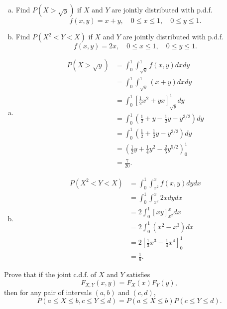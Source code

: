 \documentclass[14pt]{elegantbook}
\begin{document}
    \begin{exercise}
        \begin{enumerate}[(a)]
            \item Find $P(X>\sqrt{y})$ if $X$ and $Y$ are jointly distributed with p.d.f. 
            \[f(x,y)=x+y, \quad 0\leq x\leq 1, \quad 0\leq y\leq 1. \]
            \item Find $P(X^2<Y<X)$ if $X$ and $Y$ are jointly distributed with p.d.f.
            \[f(x,y)=2x, \quad 0\leq x\leq1, \quad 0\leq y\leq1. \]
        \end{enumerate}
    \end{exercise}

    \begin{solution}
        \begin{enumerate}[(a)]
            \item \begin{align*}
                P(X>\sqrt{y}) &= \int_0^1\int_{\sqrt{y}}^1f(x, y)dx dy\\
                &=\int_0^1\int_{\sqrt{y}}^1(x+y)dx dy\\
                &=\int_0^1\left[\frac{1}{2}x^2+yx\right]_{\sqrt{y}}^1dy\\
                &=\int_0^1\left(\frac{1}{2}+y-\frac{1}{2}y-y^{3/2}\right)dy\\
                &=\int_0^1\left(\frac{1}{2}+\frac{1}{2}y-y^{3/2}\right)dy\\
                &=\left(\frac{1}{2}y+\frac{1}{4}y^2-\frac{2}{5}y^{5/2}\right)_{0}^1\\
                &=\frac{7}{20}. 
            \end{align*}
            \item \begin{align*}
                P(X^2<Y<X) &= \int_0^1\int_{x^2}^{x}f(x, y)dy dx\\
                &=\int_0^1\int_{x^2}^{x}2x dy dx\\
                &=2\int_0^1\left[xy\right]_{x^2}^xdx\\
                &=2\int_0^1\left(x^2-x^3\right)dx\\
                &=2\left[\frac{1}{3}x^3-\frac{1}{4}x^4\right]_{0}^1\\
                &=\frac{1}{6}.
            \end{align*}
        \end{enumerate}
    \end{solution}


    \setcounter{exer}{8}
    \begin{exercise}
        Prove that if the joint c.d.f. of $X$ and $Y$ satisfies 
        \[F_{X,Y}(x,y)=F_X(x)F_Y(y), \]
        then for any pair of intervals $(a,b)$ and $(c,d)$,
        \[
            P(a\leq X\leq b, c\leq Y\leq d)=P(a\leq X\leq b)P(c\leq Y\leq d).
        \]
    \end{exercise}
\end{document}
